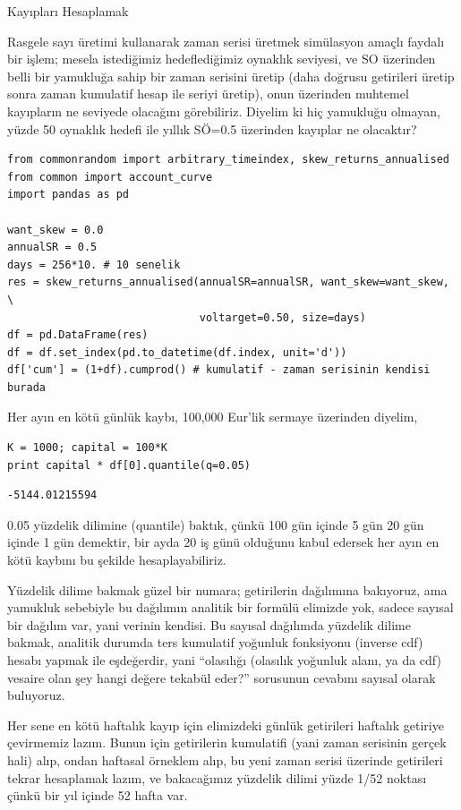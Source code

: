 \documentclass[12pt,fleqn]{article}\usepackage{../../common}
\begin{document}
Kayıpları Hesaplamak

Rasgele sayı üretimi kullanarak zaman serisi üretmek simülasyon amaçlı faydalı
bir işlem; mesela istediğimiz hedeflediğimiz oynaklık seviyesi, ve SO üzerinden
belli bir yamukluğa sahip bir zaman serisini üretip (daha doğrusu getirileri
üretip sonra zaman kumulatif hesap ile seriyi üretip), onun üzerinden muhtemel
kayıpların ne seviyede olacağını görebiliriz. Diyelim ki hiç yamukluğu olmayan,
yüzde 50 oynaklık hedefi ile yıllık SÖ=0.5 üzerinden kayıplar ne olacaktır?

\begin{verbatim}
from commonrandom import arbitrary_timeindex, skew_returns_annualised
from common import account_curve
import pandas as pd

want_skew = 0.0
annualSR = 0.5
days = 256*10. # 10 senelik
res = skew_returns_annualised(annualSR=annualSR, want_skew=want_skew, \
                              voltarget=0.50, size=days) 
df = pd.DataFrame(res)
df = df.set_index(pd.to_datetime(df.index, unit='d'))
df['cum'] = (1+df).cumprod() # kumulatif - zaman serisinin kendisi burada
\end{verbatim}

Her ayın en kötü günlük kaybı, 100,000 Eur'lik sermaye üzerinden diyelim,

\begin{verbatim}
K = 1000; capital = 100*K
print capital * df[0].quantile(q=0.05)
\end{verbatim}

\begin{verbatim}
-5144.01215594
\end{verbatim}

0.05 yüzdelik dilimine (quantile) baktık, çünkü 100 gün içinde 5 gün 20 gün
içinde 1 gün demektir, bir ayda 20 iş günü olduğunu kabul edersek her ayın en
kötü kaybını bu şekilde hesaplayabiliriz.

Yüzdelik dilime bakmak güzel bir numara; getirilerin dağılımına bakıyoruz, ama
yamukluk sebebiyle bu dağılımın analitik bir formülü elimizde yok, sadece
sayısal bir dağılım var, yani verinin kendisi. Bu sayısal dağılımda yüzdelik
dilime bakmak, analitik durumda ters kumulatif yoğunluk fonksiyonu (inverse cdf)
hesabı yapmak ile eşdeğerdir, yani ``olasılığı (olasılık yoğunluk alanı, ya da
cdf) vesaire olan şey hangi değere tekabül eder?'' sorusunun cevabını sayısal
olarak buluyoruz.

Her sene en kötü haftalık kayıp için elimizdeki günlük getirileri haftalık
getiriye çevirmemiz lazım. Bunun için getirilerin kumulatifi (yani zaman
serisinin gerçek hali) alıp, ondan haftasal örneklem alıp, bu yeni zaman serisi
üzerinde getirileri tekrar hesaplamak lazım, ve bakacağımız yüzdelik dilimi
yüzde 1/52 noktası çünkü bir yıl içinde 52 hafta var.
\end{document}
